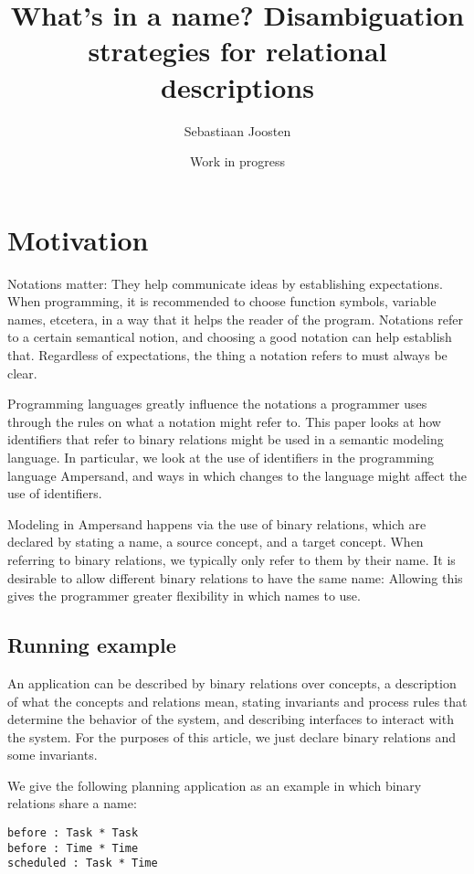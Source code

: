 \documentclass[12pt]{article}
\begin{document}
\title{What's in a name? Disambiguation strategies for relational descriptions}
\author{Sebastiaan Joosten}
\date{Work in progress}
\maketitle

\section{Motivation}
Notations matter: They help communicate ideas by establishing expectations.
When programming, it is recommended to choose function symbols, variable names, etcetera, in a way that it helps the reader of the program.
Notations refer to a certain semantical notion, and choosing a good notation can help establish that.
Regardless of expectations, the thing a notation refers to must always be clear.

Programming languages greatly influence the notations a programmer uses through the rules on what a notation might refer to.
This paper looks at how identifiers that refer to binary relations might be used in a semantic modeling language.
In particular, we look at the use of identifiers in the programming language Ampersand, and ways in which changes to the language might affect the use of identifiers.

Modeling in Ampersand happens via the use of binary relations, which are declared by stating a name, a source concept, and a target concept.
When referring to binary relations, we typically only refer to them by their name.
It is desirable to allow different binary relations to have the same name:
Allowing this gives the programmer greater flexibility in which names to use.

\subsection{Running example}
An application can be described by binary relations over concepts, a description of what the concepts and relations mean, stating invariants and process rules that determine the behavior of the system, and describing interfaces to interact with the system.
For the purposes of this article, we just declare binary relations and some invariants.

We give the following planning application as an example in which binary relations share a name:
\begin{verbatim}
before : Task * Task
before : Time * Time
scheduled : Task * Time
\end{verbatim}
\end{document}
